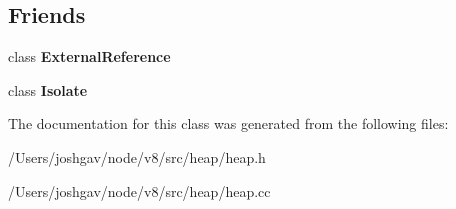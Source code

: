 \subsection*{Friends}
\begin{DoxyCompactItemize}
\item 
class {\bfseries External\+Reference}\hypertarget{classv8_1_1internal_1_1_keyed_lookup_cache_a6cad52a007e84a78f169131b667e2d49}{}\label{classv8_1_1internal_1_1_keyed_lookup_cache_a6cad52a007e84a78f169131b667e2d49}

\item 
class {\bfseries Isolate}\hypertarget{classv8_1_1internal_1_1_keyed_lookup_cache_aba4f0964bdacf2bbf62cf876e5d28d0a}{}\label{classv8_1_1internal_1_1_keyed_lookup_cache_aba4f0964bdacf2bbf62cf876e5d28d0a}

\end{DoxyCompactItemize}


The documentation for this class was generated from the following files\+:\begin{DoxyCompactItemize}
\item 
/\+Users/joshgav/node/v8/src/heap/heap.\+h\item 
/\+Users/joshgav/node/v8/src/heap/heap.\+cc\end{DoxyCompactItemize}

